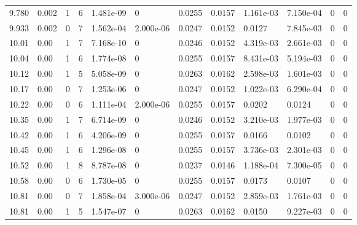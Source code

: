 \documentclass[preview]{standalone}
\begin{document}
{{{{\begin{tabular}{L{1.2cm}C{1.2cm} C{0.3cm}C{0.5cm} C{1.4cm}C{1.4cm} C{1.4cm}C{1.4cm} C{1.6cm}C{1.6cm} C{1.6cm}C{1.6cm}}
  9.780  &  0.002  & 1     &  6 &  1.481e-09  & 0  &  0.0255&   0.0157& 1.161e-03 & 7.150e-04   &  0 & 0  \\ 
  9.933  &  0.002  & 0     &  7 &  1.562e-04  & 2.000e-06  &  0.0247&   0.0152& 0.0127 & 7.845e-03   &  0 & 0  \\ 
  10.01  &  0.00  & 1     &  7 &  7.168e-10  & 0  &  0.0246&   0.0152& 4.319e-03 & 2.661e-03   &  0 & 0  \\ 
  10.04  &  0.00  & 1     &  6 &  1.774e-08  & 0  &  0.0255&   0.0157& 8.431e-03 & 5.194e-03   &  0 & 0  \\ 
  10.12  &  0.00  & 1     &  5 &  5.058e-09  & 0  &  0.0263&   0.0162& 2.598e-03 & 1.601e-03   &  0 & 0  \\ 
  10.17  &  0.00  & 0     &  7 &  1.253e-06  & 0  &  0.0247&   0.0152& 1.022e-03 & 6.290e-04   &  0 & 0  \\ 
  10.22  &  0.00  & 0     &  6 &  1.111e-04  & 2.000e-06  &  0.0255&   0.0157& 0.0202 & 0.0124   &  0 & 0  \\ 
  10.35  &  0.00  & 1     &  7 &  6.714e-09  & 0  &  0.0246&   0.0152& 3.210e-03 & 1.977e-03   &  0 & 0  \\ 
  10.42  &  0.00  & 1     &  6 &  4.206e-09  & 0  &  0.0255&   0.0157& 0.0166 & 0.0102   &  0 & 0  \\ 
  10.45  &  0.00  & 1     &  6 &  1.296e-08  & 0  &  0.0255&   0.0157& 3.736e-03 & 2.301e-03   &  0 & 0  \\ 
  10.52  &  0.00  & 1     &  8 &  8.787e-08  & 0  &  0.0237&   0.0146& 1.188e-04 & 7.300e-05   &  0 & 0  \\ 
  10.58  &  0.00  & 0     &  6 &  1.730e-05  & 0  &  0.0255&   0.0157& 0.0173 & 0.0107   &  0 & 0  \\ 
  10.81  &  0.00  & 0     &  7 &  1.858e-04  & 3.000e-06  &  0.0247&   0.0152& 2.859e-03 & 1.761e-03   &  0 & 0  \\ 
  10.81  &  0.00  & 1     &  5 &  1.547e-07  & 0  &  0.0263&   0.0162& 0.0150 & 9.227e-03   &  0 & 0  \\ 
\hline 
\end{tabular} 

}}}}
\end{document}
